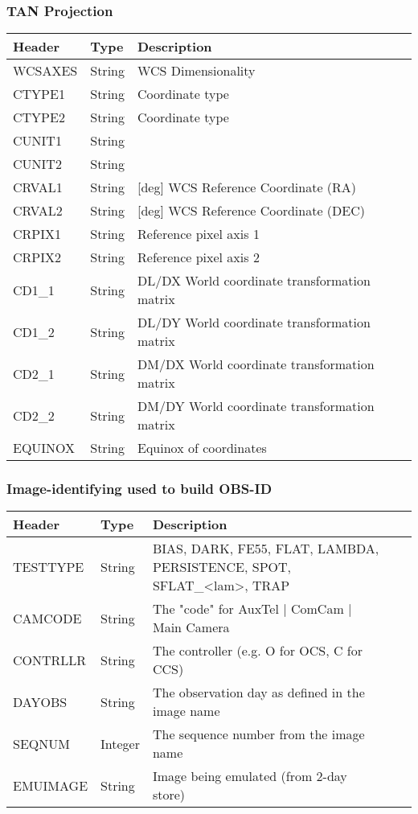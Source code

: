 \subsubsection{TAN Projection}
\begin{tabular}{l l l l l}

\hline
Header & Type & Description \\
\hline
WCSAXES & String & WCS Dimensionality \\
CTYPE1 & String & Coordinate type \\
CTYPE2 & String & Coordinate type \\
CUNIT1 & String &  \\
CUNIT2 & String &  \\
CRVAL1 & String & [deg] WCS Reference Coordinate (RA) \\
CRVAL2 & String & [deg] WCS Reference Coordinate (DEC) \\
CRPIX1 & String & Reference pixel axis 1 \\
CRPIX2 & String & Reference pixel axis 2 \\
CD1\_1 & String & DL/DX World coordinate transformation matrix \\
CD1\_2 & String & DL/DY World coordinate transformation matrix \\
CD2\_1 & String & DM/DX World coordinate transformation matrix \\
CD2\_2 & String & DM/DY World coordinate transformation matrix \\
EQUINOX & String & Equinox of coordinates \\
\hline
\end{tabular}


\subsubsection{Image-identifying used to build OBS-ID}
\begin{tabular}{l l l l l}

\hline
Header & Type & Description \\
\hline
TESTTYPE & String & BIAS, DARK, FE55, FLAT, LAMBDA, PERSISTENCE, SPOT, SFLAT\_<lam>, TRAP \\
CAMCODE & String & The "code" for AuxTel | ComCam | Main Camera \\
CONTRLLR & String & The controller (e.g. O for OCS, C for CCS) \\
DAYOBS & String & The observation day as defined in the image name  \\
SEQNUM & Integer & The sequence number from the image name \\
EMUIMAGE & String & Image being emulated (from 2-day store) \\
\hline
\end{tabular}


